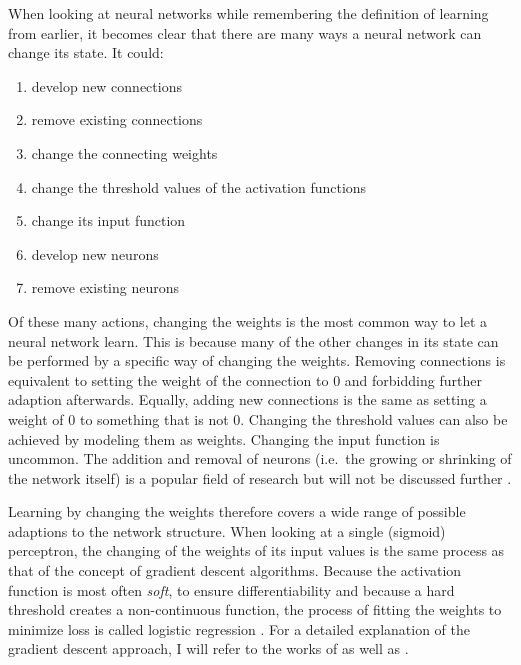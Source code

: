 When looking at neural networks while remembering the definition of learning from earlier, it becomes clear that there are many
ways a neural network can change its state. It could:

\begin{enumerate}
    \item develop new connections
    \item remove existing connections
    \item change the connecting weights
    \item change the threshold values of the activation functions
    \item change its input function
    \item develop new neurons
    \item remove existing neurons \cite[p.60]{kriesel2007brief}
\end{enumerate}

Of these many actions, changing the weights is the most common way to let a neural network learn. This is because many
of the other changes in its state can be performed by a specific way of changing the weights. Removing connections is
equivalent to setting the weight of the connection to 0 and forbidding further adaption afterwards. Equally, adding new
connections is the same as setting a weight of 0 to something that is not 0. Changing the threshold values can also be
achieved by modeling them as weights. Changing the input function is uncommon. The addition and removal of neurons
(i.e.\ the growing or shrinking of the network itself) is a popular field of research but will not be discussed further
\cite[p.60]{kriesel2007brief}.

Learning by changing the weights therefore covers a wide range of possible adaptions to the network structure. When
looking at a single (sigmoid) perceptron, the changing of the weights of its input values is the same process as that of the
concept of gradient descent algorithms. Because the activation function is most often \emph{soft}, to ensure
differentiability and because a hard threshold creates a non-continuous function, the process of fitting the weights to
minimize loss is called logistic regression \cite[p.729f.]{russell2016artificial}. For a detailed explanation of the gradient
descent approach, I will refer to the works of \citet{russell2016artificial} as well as
\citet{Goodfellow-et-al-2016}.




